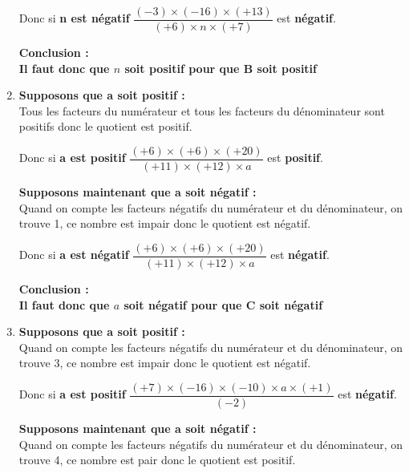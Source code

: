 \begin{corrige}
\begin{enumerate}
           \medskip
            Donc si {\bfseries \color{black}n est négatif} $ \dfrac {(-3)\times (-16)\times (+13)}{(+6)\times n\times (+7)} $ est {\bfseries \color{black}négatif}.
           
           \medskip
            {\bfseries \color[HTML]{f15929}Conclusion :} \\
           {\bfseries \color{black}Il faut donc que $ n $ soit positif pour que B soit positif}
            \item {\bfseries \color[HTML]{f15929}Supposons que a soit positif : }\\
            Tous les facteurs du numérateur et tous les facteurs du dénominateur sont positifs donc le quotient est positif.
           
           \medskip
            Donc si {\bfseries \color{black}a est positif} $ \dfrac {(+6)\times (+6)\times (+20)}{(+11)\times (+12)\times a} $ est {\bfseries \color{black}positif}.
           
           \medskip
            {\bfseries \color[HTML]{f15929}Supposons maintenant que a soit négatif : }\\
            Quand on compte les facteurs négatifs du numérateur et du dénominateur, on trouve 1, ce nombre est impair donc le quotient est négatif.
           
           \medskip
            Donc si {\bfseries \color{black}a est négatif} $ \dfrac {(+6)\times (+6)\times (+20)}{(+11)\times (+12)\times a} $ est {\bfseries \color{black}négatif}.
           
           \medskip
            {\bfseries \color[HTML]{f15929}Conclusion :} \\
           {\bfseries \color{black}Il faut donc que $ a $ soit négatif pour que C soit négatif}
            \item {\bfseries \color[HTML]{f15929}Supposons que a soit positif : }\\
            Quand on compte les facteurs négatifs du numérateur et du dénominateur, on trouve 3, ce nombre est impair donc le quotient est négatif.
           
           \medskip
            Donc si {\bfseries \color{black}a est positif} $ \dfrac {(+7)\times (-16)\times (-10)\times a\times (+1)}{(-2)} $ est {\bfseries \color{black}négatif}.
           
           \medskip
            {\bfseries \color[HTML]{f15929}Supposons maintenant que a soit négatif : }\\
            Quand on compte les facteurs négatifs du numérateur et du dénominateur, on trouve 4, ce nombre est pair donc le quotient est positif.
           

\end{enumerate}
\end{corrige}
